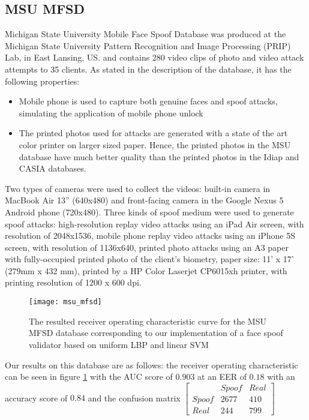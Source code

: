 \subsection{MSU MFSD}
Michigan State University Mobile Face Spoof Database was produced at the Michigan State University Pattern Recognition and Image Processing (PRIP) Lab, in East Lansing, US. and contains 280 video clips of photo and video attack attempts to 35 clients. As stated in the description of the database, it has the following properties:

\begin{itemize}
	\item Mobile phone is used to capture both genuine faces and spoof attacks, simulating the application of mobile phone unlock
	\item The printed photos used for attacks are generated with a state of the art color printer on larger sized paper. Hence, the printed photos in the MSU database have much better quality than the printed photos in the Idiap and CASIA databases.
\end{itemize}

Two types of cameras were used to collect the videos: built-in camera in MacBook Air 13” (640x480) and front-facing camera in the Google Nexus 5 Android phone (720x480). Three kinds of spoof medium were used to generate spoof attacks: high-resolution replay video attacks using an iPad Air screen, with resolution of 2048x1536, mobile phone replay video attacks using an iPhone 5S screen, with resolution of 1136x640, printed photo attacks using an A3 paper with fully-occupied printed photo of the client’s biometry, paper size: 11' x 17' (279mm x 432 mm), printed by a HP Color Laserjet CP6015xh printer, with printing resolution of 1200 x 600 dpi.
\begin{figure}
	\captionsetup{width=15cm,font=small}
	\begin{center}
		\texttt{[image: msu\_mfsd]}
	\end{center}
	\caption[MSU MFSD database resulted ROC curve]{The resulted receiver operating characteristic curve for the MSU MFSD database corresponding to our implementation of a face spoof validator based on uniform LBP and linear SVM}
	\label{fig:msu_mfsd}
\end{figure}

Our results on this database are as follows: the receiver operating characteristic can be seen in figure \ref{fig:msu_mfsd} with the AUC score of $0.903$ at an EER of $0.18$ with an accuracy score of $0.84$ and the confusion matrix 
$
[
\begin{smallmatrix}
&Spoof & Real\\
Spoof & 2677 & 410\\
Real & 244 & 799
\end{smallmatrix}] 
$



